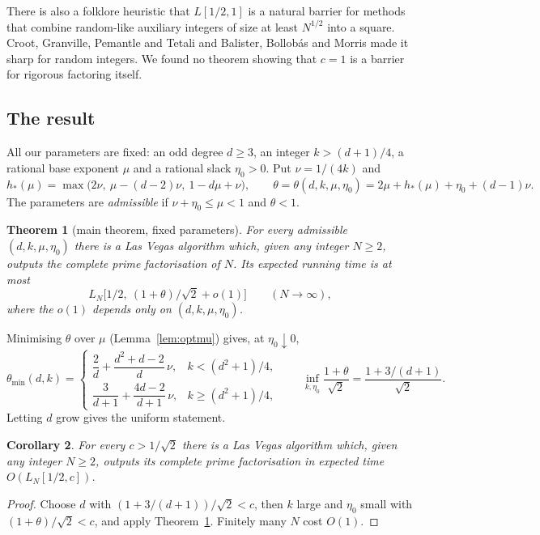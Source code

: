 \documentclass[11pt]{amsart}
\newtheorem{theorem}{Theorem}[section]
\newtheorem{corollary}[theorem]{Corollary}
\theoremstyle{definition}
\begin{document}
There is also a folklore heuristic that $L[1/2,1]$ is a natural barrier for methods that combine random-like
auxiliary integers of size at least $N^{1/2}$ into a square. Croot, Granville, Pemantle and Tetali
\cite{cgpt2012} and Balister, Bollob\'as and Morris \cite{bbm2018} made it sharp for random integers. We found no
theorem showing that $c=1$ is a barrier for rigorous factoring itself.

\subsection{The result}

All our parameters are fixed: an odd degree $d\ge3$, an integer $k>(d+1)/4$, a rational base exponent
$\mu$ and a rational slack $\eta_0>0$. Put $\nu=1/(4k)$ and
\begin{equation}\label{eq:theta}
h_*(\mu)=\max\bigl(2\nu,\ \mu-(d-2)\nu,\ 1-d\mu+\nu\bigr),\qquad
\theta=\theta(d,k,\mu,\eta_0)=2\mu+h_*(\mu)+\eta_0+(d-1)\nu .
\end{equation}
The parameters are \emph{admissible} if $\nu+\eta_0\le\mu<1$ and $\theta<1$.

\begin{theorem}[main theorem, fixed parameters]\label{thm:main}
For every admissible $(d,k,\mu,\eta_0)$ there is a Las Vegas algorithm which, given any integer $N\ge2$,
outputs the complete prime factorisation of $N$. Its expected running time is at most
\[
L_N\bigl[1/2,\ (1+\theta)/\sqrt2+o(1)\bigr]\qquad(N\to\infty),
\]
where the $o(1)$ depends only on $(d,k,\mu,\eta_0)$.
\end{theorem}

Minimising $\theta$ over $\mu$ (Lemma~\ref{lem:optmu}) gives, at $\eta_0\downarrow0$,
\[
\theta_{\min}(d,k)=\begin{cases}
\dfrac2d+\dfrac{d^2+d-2}{d}\,\nu,& k<(d^2+1)/4,\\[2mm]
\dfrac3{d+1}+\dfrac{4d-2}{d+1}\,\nu,& k\ge(d^2+1)/4,
\end{cases}
\qquad
\inf_{k,\eta_0}\frac{1+\theta}{\sqrt2}=\frac{1+3/(d+1)}{\sqrt2}.
\]
Letting $d$ grow gives the uniform statement.

\begin{corollary}\label{cor:main}
For every $c>1/\sqrt2$ there is a Las Vegas algorithm which, given any integer $N\ge2$, outputs its
complete prime factorisation in expected time $O(L_N[1/2,c])$.
\end{corollary}

\begin{proof}
Choose $d$ with $(1+3/(d+1))/\sqrt2<c$, then $k$ large and $\eta_0$ small with $(1+\theta)/\sqrt2<c$, and apply
Theorem~\ref{thm:main}. Finitely many $N$ cost $O(1)$.
\end{proof}
\end{document}
